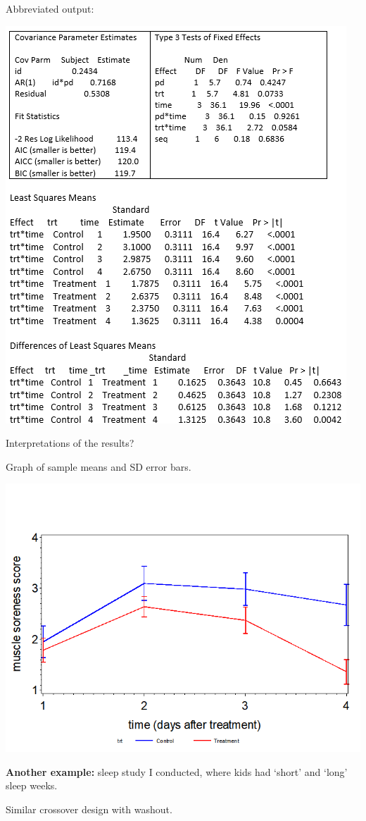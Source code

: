 \documentclass[
  9pt,
  ignorenonframetext,
]{beamer}
\begin{document}
\begin{frame}{Abbreviated output:}
\protect\hypertarget{abbreviated-output-1}{}
\begin{center}\includegraphics[width=0.7\linewidth]{figs_L11/f8} \end{center}

\alert {Interpretations of the results?}
\end{frame}

\begin{frame}{Graph of sample means and SD error bars.}
\protect\hypertarget{graph-of-sample-means-and-sd-error-bars.}{}
\begin{center}\includegraphics[width=1\linewidth]{figs_L11/f9} \end{center}

\textbf{Another example:} sleep study I conducted, where kids had
`short' and `long' sleep weeks.

Similar crossover design with washout.
\end{frame}
\end{document}
